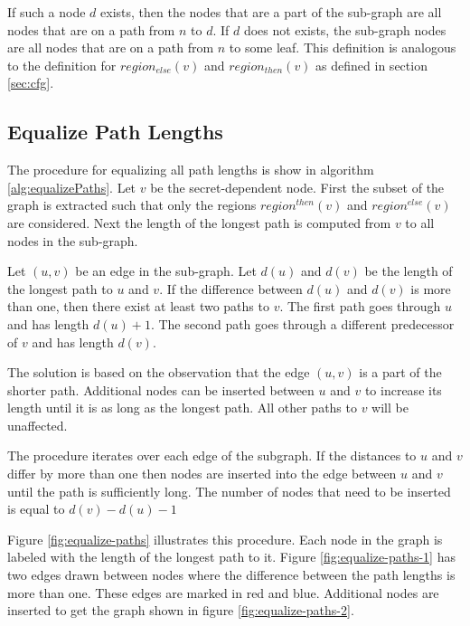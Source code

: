 If such a node $d$ exists, then the nodes that are a part of the sub-graph are all nodes that are on a path from $n$ to $d$. 
If $d$ does not exists, the sub-graph nodes are all nodes that are on a path from $n$ to some leaf. 
This definition is analogous to the definition for $region_{else}(v)$ and $region_{then}(v)$ as defined in section \ref{sec:cfg}.

\subsection{Equalize Path Lengths}

The procedure for equalizing all path lengths is show in algorithm \ref{alg:equalizePaths}.
Let $v$ be the secret-dependent node. 
First the subset of the graph is extracted such that 
only the regions $region^{then}(v)$ and $region^{else}(v)$ are considered.  
Next the length of the longest path is computed from $v$ to all nodes in the sub-graph. 

Let $(u, v)$ be an edge in the sub-graph. Let $d(u)$ and $d(v)$ be the length of the longest path to $u$ and $v$. If the difference between $d(u)$ and $d(v)$ is more than 
one, then there exist at least two paths to $v$. The first path goes through $u$ and has length $d(u)+1$. The second path goes through a different predecessor of $v$ and has 
length $d(v)$. 

The solution is based on the observation that the edge $(u, v)$ is a part of the shorter path. 
Additional nodes can be inserted between $u$ and $v$ to increase its length until it is as long as the longest path. 
All other paths to $v$ will be unaffected. 

The procedure  iterates over each edge of the subgraph. If the distances to $u$ and $v$ differ by more than one then nodes are inserted 
into the edge between $u$ and $v$ until the path is sufficiently long. The number of nodes that need to be inserted is equal to $d(v) - d(u) - 1$

Figure \ref{fig:equalize-paths} illustrates this procedure.
Each node in the graph is labeled with the length of the longest path to it. 
Figure \ref{fig:equalize-paths-1} has two edges drawn between nodes where the difference between the path lengths is more than one. These edges are marked in red and blue. 
Additional nodes are inserted to get the graph shown in figure \ref{fig:equalize-paths-2}. 


